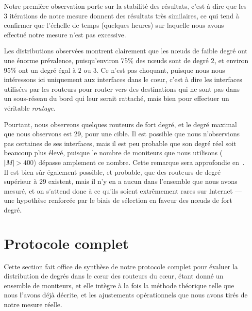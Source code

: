 
Notre première observation porte sur la stabilité des résultats, c'est à dire
que les 3 itérations de notre mesure donnent des résultats très similaires, ce
qui tend à confirmer que l'échelle de temps (quelques heures) sur laquelle nous
avons effectué notre mesure n'est pas excessive.

Les distributions observées montrent clairement que les n\oe{}uds de faible degré
ont une énorme prévalence, puisqu'environ 75\% des n\oe{}uds sont de degré 2, et
environ 95\% ont un degré égal à 2 ou 3. Ce n'est pas choquant, puisque
nous nous intéressons ici uniquement aux interfaces dans le c\oe{}ur, c'est à dire
les interfaces utilisées par les routeurs pour router vers des destinations qui
ne sont pas dans un sous-réseau du bord qui leur serait rattaché, mais bien pour
effectuer un véritable {\em routage}.

Pourtant, nous observons quelques routeurs de fort degré, et le degré maximal
que nous observons est 29, pour une cible. Il est possible que nous n'observions
pas certaines de ses interfaces, mais il est peu probable que son degré réel
soit beaucoup plus élevé, puisque le nombre de moniteurs que nous utilisons
($|M| > 400$) dépasse amplement ce nombre. Cette remarque sera approfondie
en~. Il est bien sûr également possible, et probable,
que des routeurs de degré supérieur à 29 existent, mais il n'y en a aucun dans
l'ensemble que nous avons mesuré, et on s'attend donc à ce qu'ils soient
extrêmement rares sur Internet --- une hypothèse renforcée par le biais de
sélection en faveur des n\oe{}uds de fort degré.

\section{Protocole complet}
\label{sec:udpping-protocol}

Cette section fait office de synthèse de notre protocole complet pour évaluer
la distribution de degrés dans le c\oe{}ur des routeurs du c\oe{}ur, étant donné
un ensemble de moniteurs, et elle intègre à la fois la méthode théorique telle que
nous l'avons déjà décrite, et les ajustements opérationnels que nous avons
tirés de notre mesure réelle.

